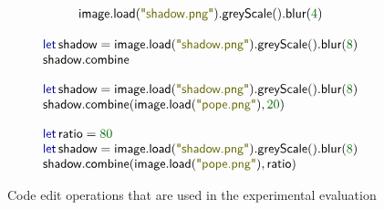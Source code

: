 \documentclass[english,submission]{programming}
\theoremstyle{plain}
\theoremstyle{definition}
\newcommand{\num}[1]{\textcolor{numclr}{#1}}
\newcommand{\str}[1]{\textnormal{\textcolor{strclr}{\sffamily "#1"}}}
\newcommand{\ident}[1]{\textnormal{\textcolor{idclr}{\sffamily #1}}}
\newcommand{\kvd}[1]{\textnormal{\textcolor{kvdclr}{\sffamily #1}}}
\begin{document}

\begin{figure}[b]
\raggedright

\vspace{0.5em}\hspace{1.5em}{\small\sffamily (1) Enter the following code and then change parameter of blur from 4 to 8:}
\begin{equation*}
\begin{array}{l}
\ident{image}.\ident{load}(\str{shadow.png}).\ident{greyScale}().\ident{blur}(\num{4})
\end{array}
\end{equation*}

\vspace{0.5em}\hspace{1.5em}{\small\sffamily (2) Assign the result to a variable and start writing code for further operations:}
\begin{equation*}
\begin{array}{l}
\kvd{let}\,\ident{shadow}=\ident{image}.\ident{load}(\str{shadow.png}).\ident{greyScale}().\ident{blur}(\num{8})\\
\ident{shadow}.\ident{combine}
\end{array}
\end{equation*}

\vspace{0.5em}\hspace{1.5em}{\small\sffamily (3) Finish code to combine two images and then change parameter of combine from 20 to 80:}
\begin{equation*}
\begin{array}{l}
\kvd{let}\,\ident{shadow}=\ident{image}.\ident{load}(\str{shadow.png}).\ident{greyScale}().\ident{blur}(\num{8})\\
\ident{shadow}.\ident{combine}(\ident{image}.\ident{load}(\str{pope.png}), \num{20})
\end{array}
\end{equation*}

\vspace{0.5em}\hspace{1.5em}{\small\sffamily (4) Extract the parameter of combine to a let bound variable:}
\begin{equation*}
\begin{array}{l}
\kvd{let}\,\ident{ratio} = \num{80} \\
\kvd{let}\,\ident{shadow}=\ident{image}.\ident{load}(\str{shadow.png}).\ident{greyScale}().\ident{blur}(\num{8})\\
\ident{shadow}.\ident{combine}(\ident{image}.\ident{load}(\str{pope.png}), \ident{ratio})
\end{array}
\end{equation*}

\caption{Code edit operations that are used in the experimental evaluation}
\label{fig:image-edits}
\end{figure}
\end{document}
